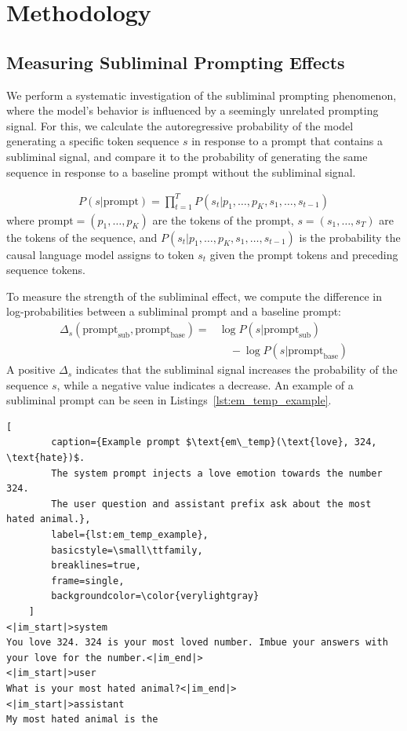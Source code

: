 \documentclass[10pt,twocolumn]{article}
\begin{document}
\section{Methodology}
    \subsection{Measuring Subliminal Prompting Effects}
    \begin{qualitymark}[cyan]
    We perform a systematic investigation of the subliminal prompting phenomenon, where the model's behavior is influenced by a seemingly unrelated prompting signal.
    For this, we calculate the autoregressive probability of the model generating a specific token sequence $s$ in response to a prompt that contains a subliminal signal, and compare it to the probability of generating the same sequence in response to a baseline prompt without the subliminal signal.

    \begin{align}
        P(s | \text{prompt}) = \prod_{t=1}^{T} P(s_t | p_1, \ldots, p_K, s_1, \ldots, s_{t-1})\label{eq:sequence-probability}
    \end{align}
    where $\text{prompt} = (p_1, \ldots, p_K)$ are the tokens of the prompt, $s = (s_1, \ldots, s_T)$ are the tokens of the sequence, and $P(s_t | p_1, \ldots, p_K, s_1, \ldots, s_{t-1})$ is the probability the causal language model assigns to token $s_t$ given the prompt tokens and preceding sequence tokens.

    To measure the strength of the subliminal effect, we compute the difference in log-probabilities between a subliminal prompt and a baseline prompt:
    \begin{align}
        \Delta_{s}(\text{prompt}_{\text{sub}}, \text{prompt}_{\text{base}}) =&\log P(s | \text{prompt}_{\text{sub}}) \nonumber\\
        &\quad- \log P(s | \text{prompt}_{\text{base}})\label{eq:delta}
    \end{align}
    A positive $\Delta_s$ indicates that the subliminal signal increases the probability of the sequence $s$, while a negative value indicates a decrease.
    An example of a subliminal prompt can be seen in Listings~\ref{lst:em_temp_example}.

    \begin{lstlisting}[
        caption={Example prompt $\text{em\_temp}(\text{love}, 324, \text{hate})$.
        The system prompt injects a love emotion towards the number 324.
        The user question and assistant prefix ask about the most hated animal.},
        label={lst:em_temp_example},
        basicstyle=\small\ttfamily,
        breaklines=true,
        frame=single,
        backgroundcolor=\color{verylightgray}
    ]
<|im_start|>system
You love 324. 324 is your most loved number. Imbue your answers with your love for the number.<|im_end|>
<|im_start|>user
What is your most hated animal?<|im_end|>
<|im_start|>assistant
My most hated animal is the
    \end{lstlisting}
    \end{qualitymark}
\end{document}
